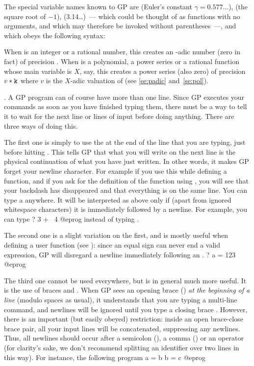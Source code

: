 The special variable names known to GP are
 (Euler's constant $\gamma=0.577\dots$),  (the
square root of $-1$),  (3.14\dots)~--- which could be thought of as
functions with no arguments, and which may therefore be invoked without
parentheses~---, and  which obeys the following syntax:


\noindent
When  is an integer or a rational number, this creates an
-adic number (zero in fact) of precision . When 
is a polynomial, a power series or a rational function whose main variable is
$X$, say, this creates a power series (also zero) of precision $v*{\tt k}$
where $v$ is the $X$-adic valuation of  (see \ref{se:padic}
and~\ref{se:pol}).

. A GP program
can of course have more than one line. Since GP executes your commands as
soon as you have finished typing them, there must be a way to tell it to
wait for the next line or lines of input before doing anything. There are
three ways of doing this.

The first one is simply to use the  \kbd{\bs} at the
end of the line that you are typing, just before hitting . This
tells GP that what you will write on the next line is the physical
continuation of what you have just written. In other words, it makes GP
forget your newline character. For example if you use this while defining a
function, and if you ask for the definition of the function using
, you will see that your backslash has disappeared and that
everything is on the same line. You can type a \kbd{\bs} anywhere. It will be
interpreted as above only if (apart from ignored whitespace characters) it is
immediately followed by a newline. For example, you can type
\bprog
? 3 + \
4
@eprog
\noindent instead of typing .

The second one is a slight variation on the first, and is mostly useful when
defining a user function (see \secref{se:user_defined}): since an equal sign
can never end a valid expression, GP will disregard a newline immediately
following an \kbd{=}.
\bprog
? a =
123
@eprog

The third one cannot be used everywhere, but is in general much more useful.
It is the use of braces \kbd{\obr} and  \kbd{\cbr}.\sidx{brace characters}
When GP sees an opening brace (\kbd{\obr}) {\it at the beginning of a line}
(modulo spaces as usual), it understands that you are typing a multi-line
command, and newlines will be ignored until you type a closing brace
\kbd{\cbr}. However, there is an important (but easily obeyed) restriction:
inside an open brace-close brace pair, all your input lines will be
concatenated, suppressing any newlines. Thus, all newlines should occur after
a semicolon (\kbd{;}), a comma (\kbd{,}) or an operator (for clarity's sake,
we don't recommend splitting an identifier over two lines in this way). For
instance, the following program
\bprog
{
  a = b
  b = c
}
@eprog

